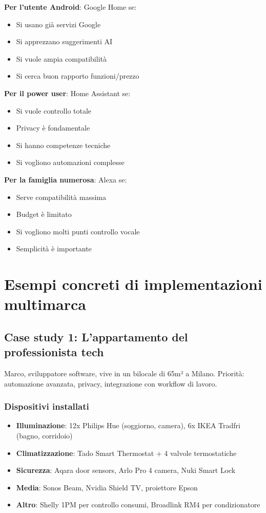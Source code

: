 \textbf{Per l'utente Android}:
Google Home se:
\begin{itemize}
    \item Si usano già servizi Google
    \item Si apprezzano suggerimenti AI
    \item Si vuole ampia compatibilità
    \item Si cerca buon rapporto funzioni/prezzo
\end{itemize}

\textbf{Per il power user}:
Home Assistant se:
\begin{itemize}
    \item Si vuole controllo totale
    \item Privacy è fondamentale
    \item Si hanno competenze tecniche
    \item Si vogliono automazioni complesse
\end{itemize}

\textbf{Per la famiglia numerosa}:
Alexa se:
\begin{itemize}
    \item Serve compatibilità massima
    \item Budget è limitato
    \item Si vogliono molti punti controllo vocale
    \item Semplicità è importante
\end{itemize}

\section{Esempi concreti di implementazioni multimarca}

\subsection{Case study 1: L'appartamento del professionista tech}

Marco, sviluppatore software, vive in un bilocale di 65m² a Milano. Priorità: automazione avanzata, privacy, integrazione con workflow di lavoro.

\subsubsection{Dispositivi installati}

\begin{itemize}
    \item \textbf{Illuminazione}: 12x Philips Hue (soggiorno, camera), 6x IKEA Tradfri (bagno, corridoio)
    \item \textbf{Climatizzazione}: Tado Smart Thermostat + 4 valvole termostatiche
    \item \textbf{Sicurezza}: Aqara door sensors, Arlo Pro 4 camera, Nuki Smart Lock
    \item \textbf{Media}: Sonos Beam, Nvidia Shield TV, proiettore Epson
    \item \textbf{Altro}: Shelly 1PM per controllo consumi, Broadlink RM4 per condizionatore
\end{itemize}

